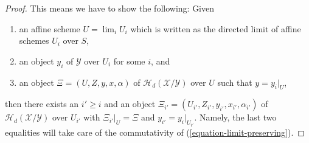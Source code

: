 \begin{proof}
This means we have to show the following: Given
\begin{enumerate}
\item an affine scheme $U = \lim_i U_i$ which is written as the
directed limit of affine schemes $U_i$ over $S$,
\item an object $y_i$ of $\mathcal{Y}$ over $U_i$ for some $i$, and
\item an object $\Xi = (U, Z, y, x, \alpha)$ of
$\mathcal{H}_d(\mathcal{X}/\mathcal{Y})$
over $U$ such that $y = y_i|_U$,
\end{enumerate}
then there exists an $i' \geq i$ and an object
$\Xi_{i'} = (U_{i'}, Z_{i'}, y_{i'}, x_{i'}, \alpha_{i'})$ of
$\mathcal{H}_d(\mathcal{X}/\mathcal{Y})$ over $U_{i'}$ with
$\Xi_{i'}|_U = \Xi$ and $y_{i'} = y_i|_{U_{i'}}$.
Namely, the last two equalities will take care of the commutativity of
(\ref{equation-limit-preserving}).


\end{proof}
